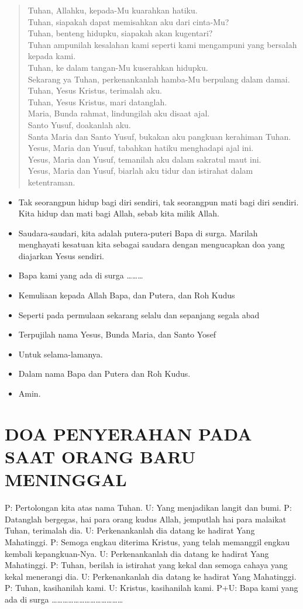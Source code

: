 \documentclass[10pt,a5paper,fancyhdr]{memoir}
\newcommand{\BU}[1]{\begin{itemize}\itemsep0pt \item[U:] #1 \end{itemize}}
\newcommand{\BPU}[1]{\begin{itemize}\itemsep0pt \item[P+U:] #1 \end{itemize}}
\newcommand{\BP}[1]{\begin{itemize}\itemsep0pt \item[P:] #1 \end{itemize}}
\begin{document}
\begin{verse}
Tuhan, Allahku, kepada-Mu kuarahkan hatiku.\\ 
Tuhan, siapakah dapat memisahkan aku dari cinta-Mu?\\ 
Tuhan, benteng hidupku, siapakah akan kugentari? \\
Tuhan ampunilah kesalahan kami seperti kami mengampuni yang 
bersalah kepada kami.\\ 
Tuhan, ke dalam tangan-Mu kuserahkan hidupku. \\
Sekarang ya Tuhan, perkenankanlah hamba-Mu berpulang dalam 
damai. \\
Tuhan, Yesus Kristus, terimalah aku.\\ 
Tuhan, Yesus Kristus, mari datanglah. \\
Maria, Bunda rahmat, lindungilah aku disaat ajal.\\ 
Santo Yusuf, doakanlah aku. \\
Santa Maria dan Santo Yusuf, bukakan aku pangkuan kerahiman 
Tuhan. \\
Yesus, Maria dan Yusuf, tabahkan hatiku menghadapi ajal ini. \\
Yesus, Maria dan Yusuf, temanilah aku dalam sakratul maut ini. \\
Yesus, Maria dan Yusuf, biarlah aku tidur dan istirahat dalam 
ketentraman. \\
\end{verse}

\BU{Tak seorangpun hidup bagi diri sendiri, tak seorangpun mati bagi 
diri sendiri. Kita hidup dan mati bagi Allah, sebab kita milik Allah. }
\BP{Saudara-saudari, kita adalah putera-puteri Bapa di surga. Marilah 
menghayati kesatuan kita sebagai saudara dengan mengucapkan doa 
yang diajarkan Yesus sendiri.} 
\BPU{Bapa kami yang ada di surga \ldots\ldots\ldots}

\BP{Kemuliaan kepada Allah Bapa, dan Putera, dan Roh Kudus} 
\BU{Seperti pada permulaan sekarang selalu dan sepanjang segala abad} 
\BP{Terpujilah nama Yesus, Bunda Maria, dan Santo Yosef} 
\BU{Untuk selama-lamanya.} 
\BP{Dalam nama Bapa dan Putera dan Roh Kudus.} 
\BU{Amin.} 

\chapter{DOA PENYERAHAN PADA SAAT ORANG BARU MENINGGAL}
P: Pertolongan kita atas nama Tuhan. 
U: Yang menjadikan langit dan bumi. 
P: Datanglah bergegas, hai para orang kudus Allah, jemputlah hai 
para malaikat Tuhan, terimalah dia. 
U: Perkenankanlah dia datang ke hadirat Yang Mahatinggi. 
P: Semoga engkau diterima Kristus, yang telah memanggil engkau 
kembali kepangkuan-Nya. 
U: Perkenankanlah dia datang ke hadirat Yang Mahatinggi. 
P: Tuhan, berilah ia istirahat yang kekal dan semoga cahaya yang 
kekal menerangi dia. 
U: Perkenankanlah dia datang ke hadirat Yang Mahatinggi. 
P: Tuhan, kasihanilah kami. 
U: Kristus, kasihanilah kami. 
P+U: Bapa kami yang ada di surga ………………………………… 
\end{document}
